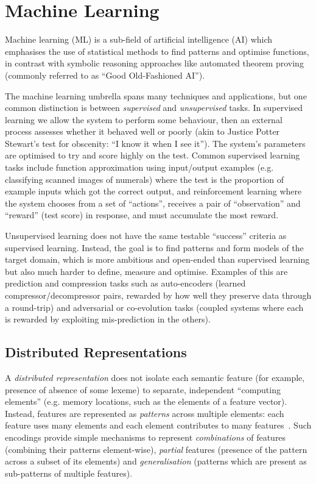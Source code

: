\section{Machine Learning}

Machine learning (ML) is a sub-field of artificial intelligence (AI) which
emphasises the use of statistical methods to find patterns and optimise
functions, in contrast with symbolic reasoning approaches like automated theorem
proving (commonly referred to as ``Good Old-Fashioned AI'').

The machine learning umbrella spans many techniques and applications, but one
common distinction is between \emph{supervised} and \emph{unsupervised} tasks.
In supervised learning we allow the system to perform some behaviour, then an
external process assesses whether it behaved well or poorly (akin to Justice
Potter Stewart's test for obscenity: ``I know it when I see it''). The system's
parameters are optimised to try and score highly on the test. Common supervised
learning tasks include function approximation using input/output examples (e.g.
classifying scanned images of numerals) where the test is the proportion of
example inputs which got the correct output, and reinforcement learning where
the system chooses from a set of ``actions'', receives a pair of ``observation''
and ``reward'' (test score) in response, and must accumulate the most reward.

Unsupervised learning does not have the same testable ``success'' criteria as
supervised learning. Instead, the goal is to find patterns and form models of
the target domain, which is more ambitious and open-ended than supervised
learning but also much harder to define, measure and optimise. Examples of this
are prediction and compression tasks such as auto-encoders
(learned compressor/decompressor pairs, rewarded by how well they preserve data
through a round-trip) and adversarial or co-evolution tasks (coupled systems
where each is rewarded by exploiting mis-prediction in the others).

\subsection{Distributed Representations}

A \emph{distributed representation} does not isolate each semantic feature (for
example, presence of absence of some lexeme) to separate, independent
``computing elements'' (e.g. memory locations, such as the elements of a feature
vector). Instead, features are represented as \emph{patterns} across multiple
elements: each feature uses many elements and each element contributes to many
features~\cite{hinton1984distributed}. Such encodings provide simple mechanisms
to represent \emph{combinations} of features (combining their patterns
element-wise), \emph{partial} features (presence of the pattern across a subset
of its elements) and \emph{generalisation} (patterns which are present as
sub-patterns of multiple features).

